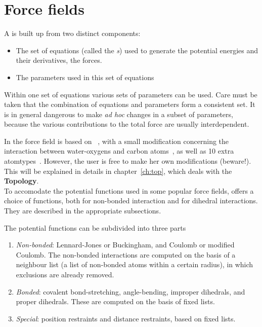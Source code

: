 \chapter{Force fields}
\label{ch:ff}
A  is built up from two distinct components:
\begin{itemize}
\item The set of equations (called the {\em {}s}) used to generate the potential energies and their
derivatives, the forces.
\item The parameters used in this set of equations
\end{itemize}
Within one set of equations various sets of parameters can be
used. Care must be taken that the combination of equations and
parameters form a consistent set. It is in general dangerous to make
{\em ad hoc} changes in a subset of parameters, because the various
contributions to the total force are usually interdependent.

In {\gromacs} {\gmxver} the force field is based on
~\cite{biomos},
with a small modification concerning the interaction between
water-oxygens and carbon atoms~\cite{Buuren93b,Mark94}, as well as 10
extra atomtypes~\cite{Jorgensen83,Buuren93a,Buuren93b,Mark94,Liu95}.
However, the user is free to make her own modifications (beware!).
This will be explained in details in chapter~\ref{ch:top}, which deals
with the {\bf Topology}.\\ To accomodate the potential functions used
in some popular force fields, {\gromacs} offers a choice of functions,
both for non-bonded interaction and for dihedral interactions. They
are described in the appropriate subsections.

The potential functions can be subdivided into three parts
\begin{enumerate}
\item   {\em Non-bonded}: Lennard-Jones or Buckingham, and Coulomb or
modified Coulomb. The non-bonded interactions are computed on the
basis of a neighbour list (a list of non-bonded atoms within a certain
radius), in which exclusions are already removed.
\item   {\em Bonded}: covalent bond-stretching, angle-bending,
improper dihedrals, and proper dihedrals. These are computed on the
basis of fixed lists. 
\item   {\em Special}: position restraints and distance restraints,
based on fixed lists. 
\end{enumerate}

